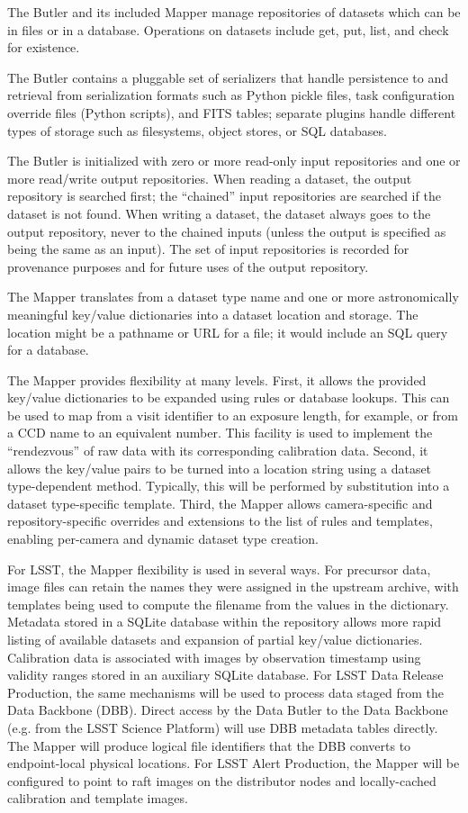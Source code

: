 \documentclass[DM,toc]{lsstdoc}
\begin{document}
The Butler and its included Mapper manage repositories
of datasets which can be in files or in a database.
Operations on datasets include get, put, list, and check for existence.

The Butler contains a pluggable set of serializers that handle persistence to
and retrieval from serialization formats such as Python pickle files, task
configuration override files (Python scripts), and FITS tables; separate
plugins handle different types of storage such as filesystems, object stores,
or SQL databases.

The Butler is initialized with zero or more read-only input repositories and
one or more read/write output repositories. When reading a dataset, the output
repository is searched first; the ``chained'' input repositories are searched
if the dataset is not found. When writing a dataset, the dataset always goes to
the output repository, never to the chained inputs (unless the output is
specified as being the same as an input).  The set of input repositories is
recorded for provenance purposes and for future uses of the output repository.

The Mapper translates from a dataset type name and one or more
astronomically meaningful key/value dictionaries into a dataset location
and storage. The location might be a pathname or URL for a file; it
would include an SQL query for a database.

The Mapper provides flexibility at many levels. First, it allows the
provided key/value dictionaries to be expanded using rules or database
lookups. This can be used to map from a visit identifier to an exposure
length, for example, or from a CCD name to an equivalent number. This
facility is used to implement the ``rendezvous'' of raw data with its
corresponding calibration data. Second, it allows the key/value pairs to
be turned into a location string using a dataset type-dependent method.
Typically, this will be performed by substitution into a dataset
type-specific template. Third, the Mapper allows camera-specific and
repository-specific overrides and extensions to the list of rules and
templates, enabling per-camera and dynamic dataset type creation.

For LSST, the Mapper flexibility is used in several ways.  For precursor data,
image files can retain the names they were assigned in the upstream archive,
with templates being used to compute the filename from the values in the
dictionary.  Metadata stored in a SQLite database within the repository allows
more rapid listing of available datasets and expansion of partial key/value
dictionaries.  Calibration data is associated with images by observation
timestamp using validity ranges stored in an auxiliary SQLite database.  For
LSST Data Release Production, the same mechanisms will be used to process data
staged from the Data Backbone (DBB).  Direct access by the Data Butler to the
Data Backbone (e.g. from the LSST Science Platform) will use DBB metadata
tables directly.  The Mapper will produce logical file identifiers that the DBB
converts to endpoint-local physical locations.  For LSST Alert Production, the
Mapper will be configured to point to raft images on the distributor nodes and
locally-cached calibration and template images.
\end{document}
